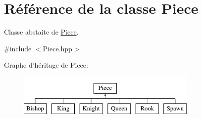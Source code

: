 \hypertarget{class_piece}{\section{Référence de la classe Piece}
\label{class_piece}
}


Classe abstaite de \hyperlink{class_piece}{Piece}.  




{\ttfamily \#include $<$Piece.\-hpp$>$}

Graphe d'héritage de Piece\-:\begin{figure}[H]
\begin{center}
\leavevmode
\includegraphics[height=2.000000cm]{class_piece}
\end{center}
\end{figure}
